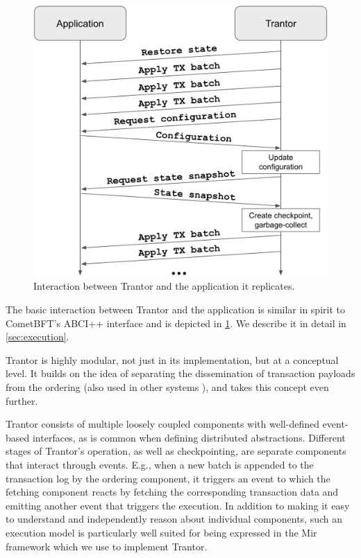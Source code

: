 \documentclass{article}
\begin{document}
\begin{figure}
    \includegraphics[width=\linewidth]{figures/application-interface.jpeg}
    \caption{Interaction between Trantor and the application it replicates.}
    \label{fig:application-interface}
\end{figure}

The basic interaction between Trantor and the application is similar in spirit to CometBFT’s ABCI++ interface \cite{abciplusplus}
and is depicted in \cref{fig:application-interface}.
We describe it in detail in \cref{sec:execution}.

Trantor is highly modular, not just in its implementation, but at a conceptual level.
It builds on the idea of separating the dissemination of transaction payloads from the ordering (also used in other systems \cite{modularblockchain,narwhal,bullshark}),
and takes this concept even further.

Trantor consists of multiple loosely coupled components with well-defined event-based interfaces, as is common when defining distributed abstractions.
Different stages of Trantor’s operation, as well as checkpointing, are separate components that interact through events.
E.g., when a new batch is appended to the transaction log by the ordering component,
it triggers an event to which the fetching component reacts by fetching the corresponding transaction data
and emitting another event that triggers the execution.
In addition to making it easy to understand and independently reason about individual components,
such an execution model is particularly well suited for being expressed in the Mir framework \cite{mir} which we use to implement Trantor.
\end{document}
